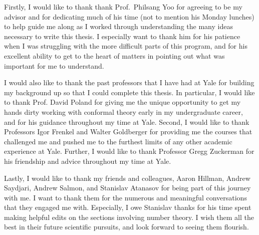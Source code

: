 Firstly, I would like to thank thank Prof.\ Philsang Yoo for agreeing to be my advisor and for dedicating much of his time (not to mention his Monday lunches) to help guide me along as I worked through understanding the many ideas necessary to write this thesis. I especially want to thank him for his patience when I was struggling with the more difficult parts of this program, and for his excellent ability to get to the heart of matters in pointing out what was important for me to understand.

I would also like to thank the past professors that I have had at Yale for building my background up so that I could complete this thesis. In particular, I would like to thank Prof. David Poland for giving me the unique opportunity to get my hands dirty working with conformal theory early in my undergraduate career, and for his guidance throughout my time at Yale. Second, I would like to thank Professors Igor Frenkel and Walter Goldberger for providing me the courses that challenged me and pushed me to the furthest limits of any other academic experience at Yale. Further, I would like to thank Professor Gregg Zuckerman for his friendship and advice throughout my time at Yale.

Lastly, I would like to thank my friends and colleagues, Aaron Hillman, Andrew Saydjari, Andrew Salmon, and Stanislav Atanasov for being part of this journey with me. I want to thank them for the numerous and meaningful conversations that they engaged me with. Especially, I owe Stanislav thanks for his time spent making helpful edits on the sections involving number theory. I wish them all the best in their future scientific pursuits, and look forward to seeing them flourish.